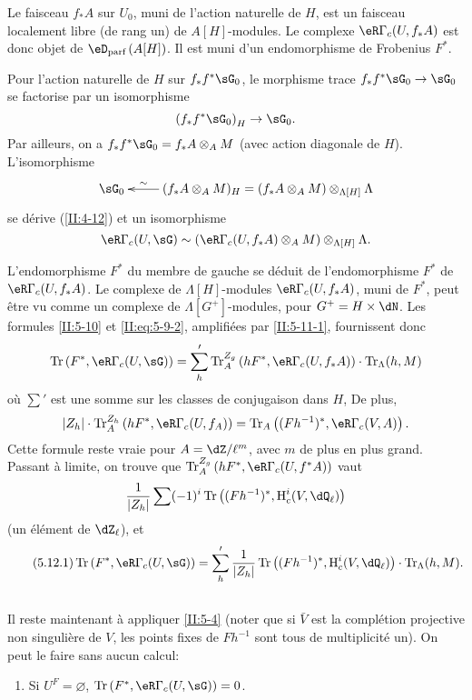 Le faisceau $f_* A$ sur $U_0$, muni de l'action naturelle de $H$, est un 
faisceau localement libre (de rang un) de $A[H]$-modules. Le complexe 
$\eR\Gamma_c(U,f_* A)$ est donc objet de $\eD_\text{parf}\left(A[H]\right)$. Il 
est muni d'un endomorphisme de Frobenius $F^*$. 

Pour l'action naturelle de $H$ sur $f_* f^*\sG_0$, le morphisme trace 
$f_* f^*\sG_0\to\sG_0$ se factorise par un isomorphisme 
\[
  \left(f_* f^*\sG_0\right)_H \to \sG_0 \text{.}
\]
Par ailleurs, on a $f_* f^*\sG_0=f_* A\otimes_A M$ (avec action diagonale de 
$H$). L'isomorphisme 
\[\xymatrix{
  \sG_0 
    & \ar[l]_-\sim (f_* A\otimes_A M)_H = (f_* A\otimes_A M)\otimes_{\Lambda[H]} \Lambda
}\]
se dérive (\ref{II:4-12}) et un isomorphisme 
\[
  \eR\Gamma_c(U,\sG) \sim \left(\eR\Gamma_c(U,f_* A)\otimes_A M\right)\otimes_{\Lambda[H]} \Lambda \text{.}
\]

L'endomorphisme $F^*$ du membre de gauche se déduit de l'endomorphisme 
$F^*$ de $\eR\Gamma_c(U,f_* A)$. Le complexe de $\Lambda[H]$-modules 
$\eR\Gamma_c(U,f_* A)$, muni de $F^*$, peut être vu comme un complexe de 
$\Lambda[G^+]$-modules, pour $G^+=H\times \dN$. Les formules \ref{II:5-10} 
et \eqref{II:eq:5-9-2}, amplifiées par \ref{II:5-11-1}, fournissent donc 
\[
  \tr\left(F^*,\eR\Gamma_c(U,\sG)\right) = \sum_h' \tr_A^{Z_g}\left(h F^*,\eR\Gamma_c(U,f_* A)\right)\cdot \tr_\Lambda(h,M)
\]
où $\sum'$ est une somme sur les classes de conjugaison dans $H$, De plus, 
\[
  |Z_h|\cdot \tr_A^{Z_h}\left(h F^*,\eR\Gamma_c(U,f_ A)\right) = \tr_A\left((F h^{-1})^*,\eR\Gamma_c(V,A)\right) \text{.}
\]
Cette formule reste vraie pour $A=\dZ/\ell^m$, avec $m$ de plus en plus grand. 
Passant à limite, on trouve que 
$\tr_A^{Z_g}\left(h F^*,\eR\Gamma_c(U,f^* A)\right)$ vaut 
\[
  \frac{1}{|Z_h|} \sum (-1)^i \tr\left((F h^{-1})^*,\h_c^i(V,\dQ_\ell)\right)
\]
(un élément de $\dZ_\ell$), et
\begin{equation*}\tag{5.12.1}\label{II:eq:5-12-1}
\tr\left(F^*,\eR\Gamma_c(U,\sG)\right) = \sum_h' \frac{1}{|Z_h|} \tr\left((F h^{-1})^*,\h_c^i(V,\dQ_\ell)\right)\cdot \tr_\Lambda(h,M) \text{.} 
\end{equation*}





\subsection{}\label{II:5-13}

Il reste maintenant à appliquer \ref{II:5-4} (noter que si $\bar V$ est la 
complétion projective non singulière de $V$, les points fixes de $F h^{-1}$ 
sont tous de multiplicité un). On peut le faire sans aucun calcul: 
\begin{enumerate}[\indent A.]
  \item Si $U^F=\varnothing$, $\tr\left(F^*,\eR\Gamma_c(U,\sG)\right) = 0$. \end{enumerate}

